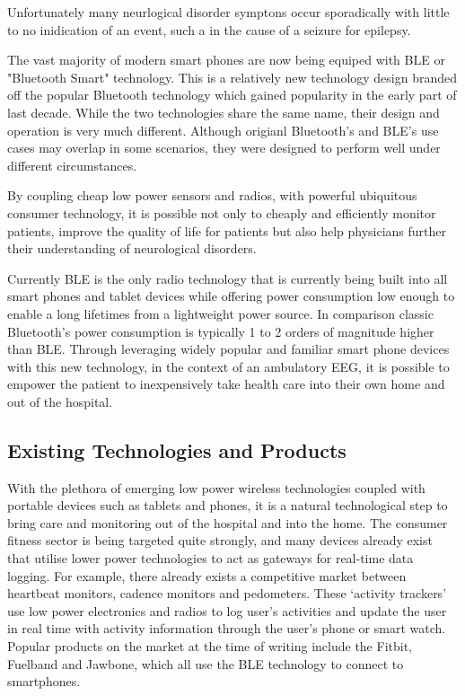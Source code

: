 \documentclass[]{article}
\begin{document}
Unfortunately many neurlogical disorder symptons occur sporadically with little to no inidication of an event, such a  in the cause of a seizure for epilepsy.



The vast majority of modern smart phones are now being equiped with \ac{BLE} or "Bluetooth Smart" technology. This is a relatively new technology design branded off the popular Bluetooth technology which gained popularity in the early part of last decade. While the two technologies share the same name, their design and operation is very much different. Although origianl Bluetooth's and \ac{BLE}'s use cases may overlap in some scenarios, they were designed to perform well under different circumstances.  

By coupling cheap low power sensors and radios, with powerful ubiquitous consumer technology, it is possible not only to cheaply and efficiently monitor patients, improve the quality of life for patients but also help physicians further their understanding of neurological disorders.

Currently \ac{BLE} is the only radio technology that is currently being built into all smart phones and tablet devices while offering power consumption low enough to enable a long lifetimes from a lightweight power source. In comparison classic Bluetooth’s power consumption is typically 1 to 2 orders of magnitude higher than BLE. Through leveraging widely popular and familiar smart phone devices with this new technology, in the context of an ambulatory EEG, it is possible to empower the patient to inexpensively take health care into their own home and out of the hospital.


\subsection{Existing Technologies and Products}


With the plethora of emerging low power wireless technologies coupled with portable devices such as tablets and phones, it is a natural technological step to bring care and monitoring out of the hospital and into the home. The consumer fitness sector is being targeted quite strongly, and many devices already exist that utilise lower power technologies to act as gateways for real-time data logging. For example, there already exists a competitive market between heartbeat monitors, cadence monitors and pedometers. These ‘activity trackers’ use low power electronics and radios to log user’s activities and update the user in real time with activity information through the user’s phone or smart watch. Popular products on the market at the time of writing include the Fitbit, Fuelband and Jawbone, which all use the \ac{BLE} technology to connect to smartphones.
\end{document}
